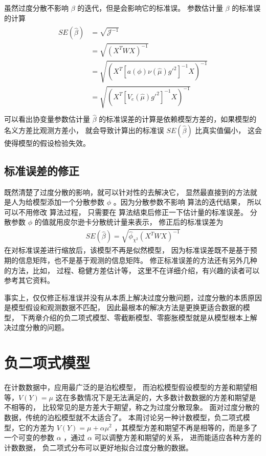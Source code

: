 \documentclass[letterpaper,10pt,english]{sphinxmanual}
\begin{document}
虽然过度分散不影响 \(\beta\) 的迭代，但是会影响它的标准误。
参数估计量 \(\beta\) 的标准误的计算
\begin{align}\label{equation:过度分散/content:过度分散/content:7}\!\begin{aligned}
SE(\hat{\beta}) &= \sqrt{\mathcal{J}^{-1}}\\
&= \sqrt{ {(X^T W X)}^{-1} }\\
&=  \sqrt{ {(X^T [a(\phi)\nu(\hat{\mu}) g'^2]^{-1} X)}^{-1} }\\
&=  \sqrt{ {(X^T [V_e(\hat{\mu}) g'^2]^{-1} X)}^{-1} }\\
\end{aligned}\end{align}
可以看出协变量参数估计量 \(\hat{\beta}\)
的标准误差的计算是依赖模型方差的，如果模型的名义方差比观测方差小，
就会导致计算出的标准误 \(SE(\hat{\beta})\) 比真实值偏小，
这会使得模型的假设检验失效。


\section{标准误差的修正}
\label{\detokenize{_u8fc7_u5ea6_u5206_u6563/content:id5}}
既然清楚了过度分散的影响，就可以针对性的去解决它，
显然最直接到的方法就是人为给模型添加一个分散参数 \(\phi\)
。因为分散参数不影响  算法的迭代结果，
所以可以不用修改  算法过程，
只需要在  算法结束后修正一下估计量的标准误差。
分散参数 \(\phi\) 的值就用皮尔逊卡分散统计量来表示，
修正后的标准误差为
\begin{equation}\label{equation:过度分散/content:过度分散/content:8}
\begin{split}SE(\hat{\beta}) =  \sqrt{ \hat{\phi}_{\chi^2} {(X^T W X)}^{-1} }\end{split}
\end{equation}
在对标准误差进行缩放后，该模型不再是似然模型，
因为标准误差既不是基于预期的信息矩阵，也不是基于观测的信息矩阵。
修正标准误差的方法还有另外几种的方法，比如， 过程、稳健方差估计等，
这里不在详细介绍，有兴趣的读者可以参考其它资料。

事实上，仅仅修正标准误并没有从本质上解决过度分散问题，过度分散的本质原因是模型假设和观测数据不匹配，
因此最根本的解决方法是更换更适合数据的模型，
下两章介绍的负二项式模型、零截断模型、零膨胀模型就是从模型根本上解决过度分散的问题。


\chapter{负二项式模型}
\label{\detokenize{_u8d1f_u4e8c_u9879_u6a21_u578b/content:id1}}\label{\detokenize{_u8d1f_u4e8c_u9879_u6a21_u578b/content::doc}}
在计数数据中，应用最广泛的是泊松模型，
而泊松模型假设模型的方差和期望相等，\(V(Y)=\mu\)
这在多数情况下是无法满足的，大多数计数数据的方差和期望是不相等的，
比较常见的是方差大于期望，称之为过度分散现象。
面对过度分散的数据，传统的泊松模型就不太适合了。
本周讨论另一种计数模型，负二项式模型，它的方差为
\(V(Y) = \mu+\alpha \mu^2\)
，其模型方差和期望不再是相等的，而是多了一个可变的参数 \(\alpha\)
，通过 \(\alpha\) 可以调整方差和期望的关系，
进而能适应各种方差的计数数据，
负二项式分布可以更好地拟合过度分散的数据。
\end{document}
